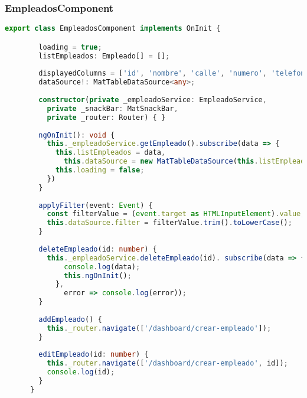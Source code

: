\documentclass[a4paper]{article} %
\begin{document}
\subsubsection{EmpleadosComponent}
\begin{lstlisting}[language=Typescript]
	export class EmpleadosComponent implements OnInit {

		loading = true;
		listEmpleados: Empleado[] = [];
	  
		displayedColumns = ['id', 'nombre', 'calle', 'numero', 'telefono', 'email', 'ventas', 'horas','acciones'];
		dataSource!: MatTableDataSource<any>;
	  
		constructor(private _empleadoService: EmpleadoService,
		  private _snackBar: MatSnackBar,
		  private _router: Router) { }
	  
		ngOnInit(): void {
		  this._empleadoService.getEmpleado().subscribe(data => {
			this.listEmpleados = data,
			  this.dataSource = new MatTableDataSource(this.listEmpleados);
			this.loading = false;
		  })
		}
	  
		applyFilter(event: Event) {
		  const filterValue = (event.target as HTMLInputElement).value;
		  this.dataSource.filter = filterValue.trim().toLowerCase();
		}
	  
		deleteEmpleado(id: number) {
		  this._empleadoService.deleteEmpleado(id). subscribe(data => {
			  console.log(data);
			  this.ngOnInit();
			},
			  error => console.log(error));
		}
	  
		addEmpleado() {
		  this._router.navigate(['/dashboard/crear-empleado']);
		}
	  
		editEmpleado(id: number) {
		  this._router.navigate(['/dashboard/crear-empleado', id]);
		  console.log(id);
		}
	  }
\end{lstlisting}\clearpage
\end{document}
